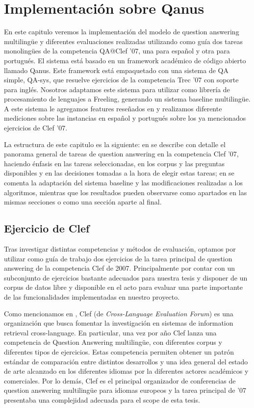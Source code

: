 \chapter{Implementación sobre Qanus}
\label{chap:qanus} \label{chap:5}
\faltadependiente
En este capitulo veremos la implementación del modelo de question answering multilingüe y diferentes evaluaciones realizadas utilizando como guía dos tareas monolingües de la competencia QA@Clef '07, una para español y otra para portugués. El sistema está basado en un framework académico de código abierto llamado Qanus. Este framework está empaquetado con una sistema de QA simple, QA-sys, que resuelve ejercicios de la competencia Trec '07 con soporte para inglés. Nosotros adaptamos este sistema para utilizar como librería de procesamiento de lenguajes a Freeling, generando un sistema baseline multilingüe. A este sistema le agregamos features reseñados en  y realizamos diferente mediciones sobre las instancias en español y portugués sobre los ya mencionados ejercicios de Clef '07.

La estructura de este capitulo es la siguiente: en  se describe con detalle el panorama general de tareas de question answering en la competencia Clef '07, haciendo énfasis en las tareas seleccionadas, en los corpus y las preguntas disponibles y en las decisiones tomadas a la hora de elegir estas tareas; en  se comenta la adaptación del sistema baseline y las modificaciones realizadas a los algoritmos, {\color{red}mientras que los resultados pueden observarse como apartados en las mismas secciones o como una sección aparte al final}.

\section{Ejercicio de Clef}
\label{sec:ejercicio-de-clef}
Tras investigar distintas competencias y métodos de evaluación, optamos por utilizar como guía de trabajo dos ejercicios de la tarea principal de question answering de la competencia Clef de 2007. Principalmente por contar con un subconjunto de ejercicios bastante adecuados para nuestra tesis y disponer de un corpus de datos libre y disponible en el acto para evaluar una parte importante de las funcionalidades implementadas en nuestro proyecto.

Como mencionamos en , Clef (de \textit{Cross-Language Evaluation Forum}) es una organización que busca fomentar la investigación en sistemas de information retrieval cross-language. En particular, una vez por año Clef lanza una competencia de Question Answering multilingüe, con diferentes corpus y diferentes tipos de ejercicios. Estas competencia permiten obtener un patrón estándar de comparación entre distintos desarrollos y una idea general del estado de arte alcanzado en los diferentes idiomas por la diferentes actores académicos y comerciales. Por lo demás, Clef es el principal organizador de conferencias de question answering multilingüe para idiomas europeos y la tarea principal de '07 presentaba una complejidad adecuada para el scope de esta tesis.

